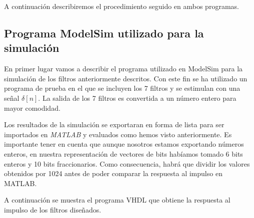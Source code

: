 \documentclass[a4paper,12pt]{article}
\begin{document}
A continuación describiremos el procedimiento seguido en ambos programas.

\subsection{Programa ModelSim utilizado para la simulación}

En primer lugar vamos a describir el programa utilizado en ModelSim para la simulación de los filtros anteriormente descritos. Con este fin se ha utilizado un programa de prueba en el que se incluyen los 7 filtros y se estimulan con una señal $\delta[n]$. La salida de los 7 filtros es convertida a un número entero para mayor comodidad.

Los resultados de la simulación se exportaran en forma de lista para ser importados en \emph{MATLAB} y evaluados como hemos visto anteriormente. Es importante tener en cuenta que aunque nosotros estamos exportando números enteros, en nuestra representación de vectores de bits habíamos tomado 6 bits enteros y 10 bits fraccionarios. Como consecuencia, habrá que dividir los valores obtenidos por 1024 antes de poder comparar la respuesta al impulso en MATLAB.

A continuación se muestra el programa VHDL que obtiene la respuesta al impulso de los filtros diseñados.
\end{document}
